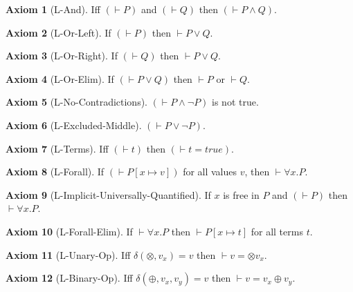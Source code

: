 \documentclass[10pt]{article}
\theoremstyle{definition}
\newtheorem{axiom}{Axiom}
\begin{document}
\begin{axiom}[L-And] 
  Iff $(\vdash P)$ and $(\vdash Q)$ then $(\vdash P \wedge Q)$.
\end{axiom}

\begin{axiom}[L-Or-Left] 
  If $(\vdash P)$ then $\vdash P \vee Q$.
\end{axiom}

\begin{axiom}[L-Or-Right] 
  If $(\vdash Q)$ then $\vdash P \vee Q$.
\end{axiom}

\begin{axiom}[L-Or-Elim] 
  If $(\vdash P \vee Q)$ then $\vdash P$ or $\vdash Q$.
\end{axiom}

\begin{axiom}[L-No-Contradictions]
  $(\vdash P \wedge \neg P)$ is not true.
\end{axiom}

\begin{axiom}[L-Excluded-Middle]
  $(\vdash P \vee \neg P)$.
\end{axiom}
  
\begin{axiom}[L-Terms]
  Iff $(\vdash t)$ then $(\vdash t = true)$.
\end{axiom}
  
\begin{axiom}[L-Forall]
  If $(\vdash P[x\mapsto v])$ for all values $v$, then $\vdash \forall x. P$.
\end{axiom}

\begin{axiom}[L-Implicit-Universally-Quantified]
  If $x$ is free in $P$ and $(\vdash P)$ then $\vdash \forall x. P$.
\end{axiom}

\begin{axiom}[L-Forall-Elim]
  If $\vdash \forall x. P$ then $\vdash P[x\mapsto t]$ for all terms $t$.
\end{axiom}

\begin{axiom}[L-Unary-Op]
  Iff $\delta(\otimes, v_x) = v$ then $\vdash v = \otimes v_x$.
\end{axiom}

\begin{axiom}[L-Binary-Op]
  Iff $\delta(\oplus, v_x, v_y) = v$ then $\vdash v = v_x \oplus v_y$.
\end{axiom}
\end{document}
